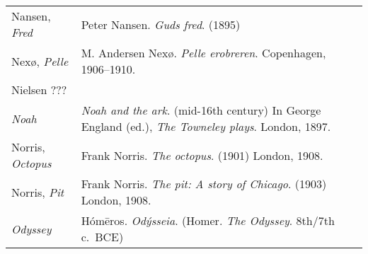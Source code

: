 \begin{longtable}{p{} p{}}
Nansen, \textit{Fred} & Peter Nansen. \textit{Guds fred}. (1895) \\
%

Nexø, \textit{Pelle} & M. Andersen Nexø. \textit{Pelle erobreren}. Copenhagen, 1906--1910. \\

Nielsen ??? \\ %

\textit{Noah} & \textit{Noah and the ark}. (mid-16th century) In George England (ed.), \textit{The Towneley plays}. London, 1897. \\
%

Norris, \textit{Octopus} & Frank Norris. \textit{The octopus}. (1901) London, 1908. \\
Norris, \textit{Pit} & Frank Norris. \textit{The pit: A story of Chicago}. (1903) London, 1908. \\ 

\textit{Odyssey} & Hómēros. \textit{Odýsseia}. (Homer. \textit{The Odyssey}. 8th/\linebreak[2]7th c.~BCE) \\


\end{longtable}
